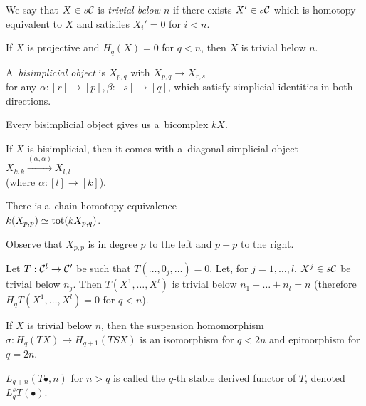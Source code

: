     \begin{definition}
        We say that $X \in s\mathcal{C}$ is {\em trivial below $n$}
        if there exists $X' \in s\mathcal{C}$ which is homotopy equivalent to $X$
        and satisfies $X_i' = 0$ for $i<n$.
    \end{definition}
    
    \begin{lemma}
        If $X$ is projective and $H_q(X) = 0$
        for $q<n$, then $X$ is trivial below $n$.
    \end{lemma}
    
    \begin{remark}[digression]
        A~{\em bisimplicial object}
        is $X_{p,q}$ with $X_{p,q} \to X_{r,s}$
        \\for any $\alpha:[r]\to [p], \beta:[s]\to [q]$,
        which satisfy simplicial identities in both directions.
        
        Every bisimplicial object gives us a~bicomplex $kX$.
        
        If $X$ is bisimplicial, then it comes with a~diagonal
        simplicial object $X_{k,k} \xrightarrow{(\alpha,\alpha)} X_{l,l}$
        \\ (where $\alpha:[l]\to[k]$).
    \end{remark}
    
    \begin{theorem}
        There is a~chain homotopy equivalence 
        \\$k(X_{p,p}) \simeq {\mathrm{tot}}(k X_{p,q})$.
    \end{theorem}
    
    \begin{remark}
        Observe that $X_{p,p}$ is in degree $p$
        to the left and $p+p$ to the right.
    \end{remark}
    
    \begin{proposition}
        Let $T:\mathcal{C}^l \to \mathcal{C}'$
        be such that $T(\ldots, 0_j, \ldots) = 0$.
        Let, for $j=1, \ldots, l$, $X^j \in s\mathcal{C}$ be trivial below $n_j$.
        Then $T(X^1, \ldots, X^l)$ is trivial below $n_1 + \ldots + n_l = n$
        (therefore $H_q T(X^1, \ldots, X^l) = 0$ for $q < n$).
    \end{proposition}
    
    \begin{corollary}
        If $X$ is trivial below $n$, then the suspension homomorphism
        \\$\sigma:H_q(TX) \to H_{q+1}(TSX)$ is an isomorphism
        for $q<2n$ and epimorphism for $q = 2n$.
    \end{corollary}
    
    \begin{definition}
        $L_{q+n}(T \bullet, n)$ for $n>q$ is called
        the $q$-th stable derived functor of $T$,
        denoted $L_q^s T(\bullet)$.
    \end{definition}


 
 